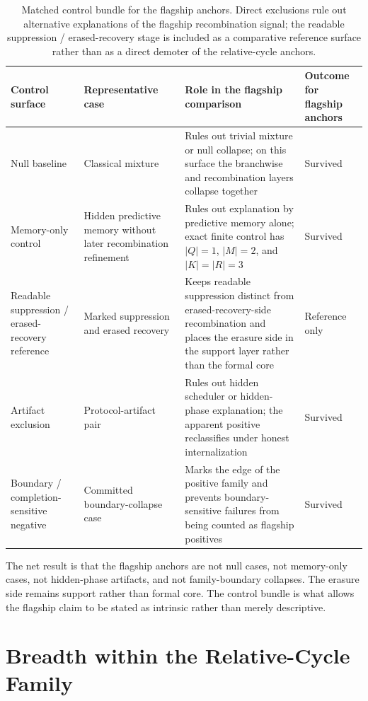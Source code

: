 \documentclass[11pt]{article}
\theoremstyle{definition}
\begin{document}
\begin{table}[t]
\centering
\small
\caption{Matched control bundle for the flagship anchors. Direct exclusions rule out alternative explanations of the flagship recombination signal; the readable suppression / erased-recovery stage is included as a comparative reference surface rather than as a direct demoter of the relative-cycle anchors.}
\label{tab:controls-and-exclusions}
\begin{tabular}{p{2.8cm}p{3.2cm}p{4.2cm}p{2.7cm}}
\toprule
Control surface & Representative case & Role in the flagship comparison & Outcome for flagship anchors \\
\midrule
Null baseline &
Classical mixture &
Rules out trivial mixture or null collapse; on this surface the branchwise and recombination layers collapse together &
Survived \\
\addlinespace
Memory-only control &
Hidden predictive memory without later recombination refinement &
Rules out explanation by predictive memory alone; exact finite control has $|Q|=1$, $|M|=2$, and $|K|=|R|=3$ &
Survived \\
\addlinespace
Readable suppression / erased-recovery reference &
Marked suppression and erased recovery &
Keeps readable suppression distinct from erased-recovery-side recombination and places the erasure side in the support layer rather than the formal core &
Reference only \\
\addlinespace
Artifact exclusion &
Protocol-artifact pair &
Rules out hidden scheduler or hidden-phase explanation; the apparent positive reclassifies under honest internalization &
Survived \\
\addlinespace
Boundary / completion-sensitive negative &
Committed boundary-collapse case &
Marks the edge of the positive family and prevents boundary-sensitive failures from being counted as flagship positives &
Survived \\
\bottomrule
\end{tabular}
\end{table}
 
The net result is that the flagship anchors are not null cases, not memory-only cases, not hidden-phase artifacts, and not family-boundary collapses. The erasure side remains support rather than formal core. The control bundle is what allows the flagship claim to be stated as intrinsic rather than merely descriptive.

\section{Breadth within the Relative-Cycle Family}
\end{document}
